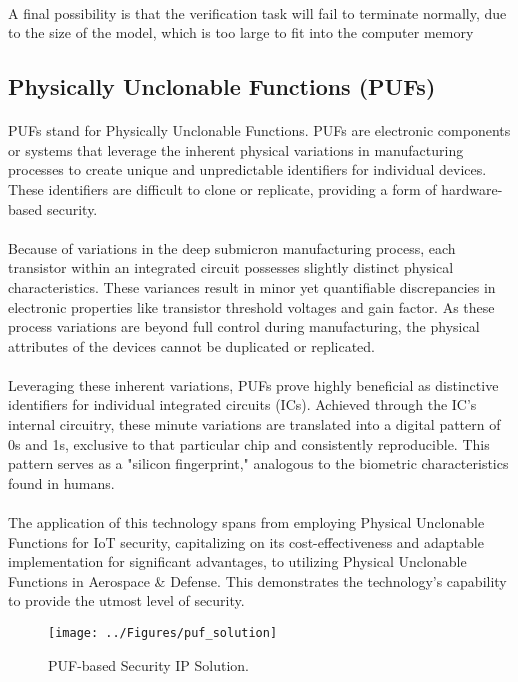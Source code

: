 \begin{enumerate}
\begin{itemize}
		\paragraph*{}
		A final possibility is that the verification task will fail to terminate normally, due to the size of the model, which is too large to fit into the computer memory
				
	\end{itemize} 
	
\end{enumerate}

\subsection{Physically Unclonable Functions (PUFs)}
\paragraph*{}
PUFs stand for Physically Unclonable Functions. PUFs are electronic components or systems that leverage the inherent physical variations in manufacturing processes to create unique and unpredictable identifiers for individual devices. These identifiers are difficult to clone or replicate, providing a form of hardware-based security.
\paragraph*{}
Because of variations in the deep submicron manufacturing process, each transistor within an integrated circuit possesses slightly distinct physical characteristics. These variances result in minor yet quantifiable discrepancies in electronic properties like transistor threshold voltages and gain factor. As these process variations are beyond full control during manufacturing, the physical attributes of the devices cannot be duplicated or replicated.
\paragraph*{}
Leveraging these inherent variations, PUFs prove highly beneficial as distinctive identifiers for individual integrated circuits (ICs). Achieved through the IC's internal circuitry, these minute variations are translated into a digital pattern of 0s and 1s, exclusive to that particular chip and consistently reproducible. This pattern serves as a "silicon fingerprint," analogous to the biometric characteristics found in humans.
\paragraph*{}
The application of this technology spans from employing Physical Unclonable Functions for IoT security, capitalizing on its cost-effectiveness and adaptable implementation for significant advantages, to utilizing Physical Unclonable Functions in Aerospace \& Defense. This demonstrates the technology's capability to provide the utmost level of security.
\begin{figure}[h]
	\centering
	\texttt{[image: ../Figures/puf\_solution]}
	\caption{PUF-based Security IP Solution.}
	\label{fig:pufsolution}
\end{figure}

